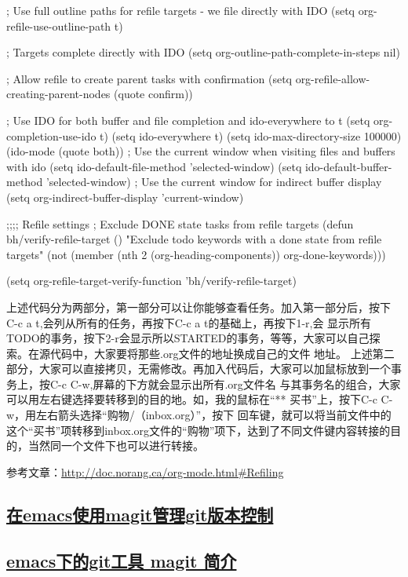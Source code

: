 \documentclass[11pt]{ctexart}
\begin{document}
; Use full outline paths for refile targets - we file directly with IDO
(setq org-refile-use-outline-path t)

; Targets complete directly with IDO
(setq org-outline-path-complete-in-steps nil)

; Allow refile to create parent tasks with confirmation
(setq org-refile-allow-creating-parent-nodes (quote confirm))

; Use IDO for both buffer and file completion and ido-everywhere to t
(setq org-completion-use-ido t)
(setq ido-everywhere t)
(setq ido-max-directory-size 100000)
(ido-mode (quote both))
; Use the current window when visiting files and buffers with ido
(setq ido-default-file-method 'selected-window)
(setq ido-default-buffer-method 'selected-window)
; Use the current window for indirect buffer display
(setq org-indirect-buffer-display 'current-window)

;;;; Refile settings
; Exclude DONE state tasks from refile targets
(defun bh/verify-refile-target ()
  "Exclude todo keywords with a done state from refile targets"
  (not (member (nth 2 (org-heading-components)) org-done-keywords)))

(setq org-refile-target-verify-function 'bh/verify-refile-target)

      上述代码分为两部分，第一部分可以让你能够查看任务。加入第一部分后，按下C-c a t,会列从所有的任务，再按下C-c a t的基础上，再按下1-r,会
显示所有TODO的事务，按下2-r会显示所以STARTED的事务，等等，大家可以自己探索。在源代码中，大家要将那些.org文件的地址换成自己的文件
地址。
     上述第二部分，大家可以直接拷贝，无需修改。再加入代码后，大家可以加鼠标放到一个事务上，按C-c C-w,屏幕的下方就会显示出所有.org文件名
与其事务名的组合，大家可以用左右键选择要转移到的目的地。如，我的鼠标在“** 买书”上，按下C-c C-w，用左右箭头选择“购物/（inbox.org）”，按下
回车键，就可以将当前文件中的这个“买书”项转移到inbox.org文件的“购物”项下，达到了不同文件键内容转接的目的，当然同一个文件下也可以进行转接。

参考文章：\url{http://doc.norang.ca/org-mode.html\#Refiling}

\subsection{\href{http://www.fidding.me/article/16}{在emacs使用magit管理git版本控制}}
\label{sec:orga06b434}
\subsection{\hyperref[sec:org230d937]{emacs下的git工具 magit 简介}}
\label{sec:org8fc07a3}
\end{document}

